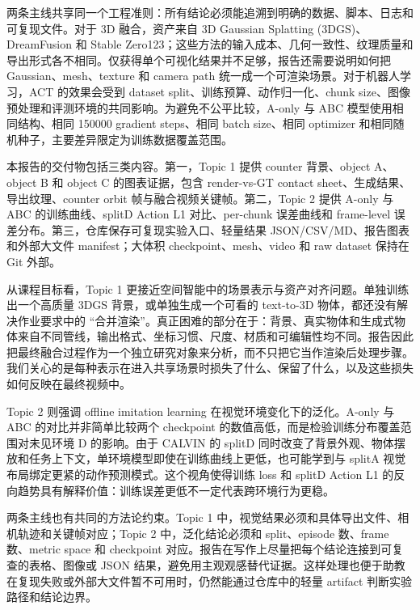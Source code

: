 \documentclass{article}
\begin{document}
	两条主线共享同一个工程准则：所有结论必须能追溯到明确的数据、脚本、日志和可复现文件。对于 3D 融合，资产来自 3D Gaussian Splatting (3DGS)、DreamFusion 和 Stable Zero123；这些方法的输入成本、几何一致性、纹理质量和导出形式各不相同。仅获得单个可视化结果并不足够，报告还需要说明如何把 Gaussian、mesh、texture 和 camera path 统一成一个可渲染场景。对于机器人学习，ACT 的效果会受到 dataset split、训练预算、动作归一化、chunk size、图像预处理和评测环境的共同影响。为避免不公平比较，A-only 与 ABC 模型使用相同结构、相同 150000 gradient steps、相同 batch size、相同 optimizer 和相同随机种子，主要差异限定为训练数据覆盖范围。

	本报告的交付物包括三类内容。第一，Topic 1 提供 counter 背景、object A、object B 和 object C 的图表证据，包含 render-vs-GT contact sheet、生成结果、导出纹理、counter orbit 帧与融合视频关键帧。第二，Topic 2 提供 A-only 与 ABC 的训练曲线、splitD Action L1 对比、per-chunk 误差曲线和 frame-level 误差分布。第三，仓库保存可复现实验入口、轻量结果 JSON/CSV/MD、报告图表和外部大文件 manifest；大体积 checkpoint、mesh、video 和 raw dataset 保持在 Git 外部。

	从课程目标看，Topic 1 更接近空间智能中的场景表示与资产对齐问题。单独训练出一个高质量 3DGS 背景，或单独生成一个可看的 text-to-3D 物体，都还没有解决作业要求中的 ``合并渲染''。真正困难的部分在于：背景、真实物体和生成式物体来自不同管线，输出格式、坐标习惯、尺度、材质和可编辑性均不同。报告因此把最终融合过程作为一个独立研究对象来分析，而不只把它当作渲染后处理步骤。我们关心的是每种表示在进入共享场景时损失了什么、保留了什么，以及这些损失如何反映在最终视频中。

	Topic 2 则强调 offline imitation learning 在视觉环境变化下的泛化。A-only 与 ABC 的对比并非简单比较两个 checkpoint 的数值高低，而是检验训练分布覆盖范围对未见环境 D 的影响。由于 CALVIN 的 splitD 同时改变了背景外观、物体摆放和任务上下文，单环境模型即使在训练曲线上更低，也可能学到与 splitA 视觉布局绑定更紧的动作预测模式。这个视角使得训练 loss 和 splitD Action L1 的反向趋势具有解释价值：训练误差更低不一定代表跨环境行为更稳。

	两条主线也有共同的方法论约束。Topic 1 中，视觉结果必须和具体导出文件、相机轨迹和关键帧对应；Topic 2 中，泛化结论必须和 split、episode 数、frame 数、metric space 和 checkpoint 对应。报告在写作上尽量把每个结论连接到可复查的表格、图像或 JSON 结果，避免用主观观感替代证据。这样处理也便于助教在复现失败或外部大文件暂不可用时，仍然能通过仓库中的轻量 artifact 判断实验路径和结论边界。
\end{document}
